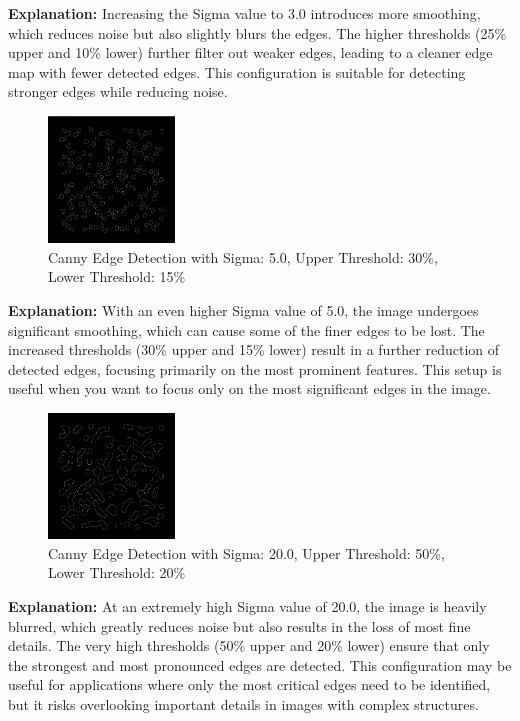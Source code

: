 \documentclass[%
	a4paper, %
	12pt, %
	english, %
	bibtotoc %
]{scrartcl}
\begin{document}
\textbf{Explanation:} Increasing the Sigma value to 3.0 introduces more smoothing, which reduces noise but also slightly blurs the edges. The higher thresholds (25\% upper and 10\% lower) further filter out weaker edges, leading to a cleaner edge map with fewer detected edges. This configuration is suitable for detecting stronger edges while reducing noise.

\begin{figure}[H]
    \centering
    \includegraphics[width=0.3\textwidth]{latex-template-ss24/images/5_30_15_canny.png}
    \caption{Canny Edge Detection with Sigma: 5.0, Upper Threshold: 30\%, Lower Threshold: 15\%}
    \label{fig:5_30_15_canny}
\end{figure}

\textbf{Explanation:} With an even higher Sigma value of 5.0, the image undergoes significant smoothing, which can cause some of the finer edges to be lost. The increased thresholds (30\% upper and 15\% lower) result in a further reduction of detected edges, focusing primarily on the most prominent features. This setup is useful when you want to focus only on the most significant edges in the image.

\begin{figure}[H]
    \centering
    \includegraphics[width=0.3\textwidth]{latex-template-ss24/images/20_50_20_canny.png}
    \caption{Canny Edge Detection with Sigma: 20.0, Upper Threshold: 50\%, Lower Threshold: 20\%}
    \label{fig:20_50_20_canny}
\end{figure}

\textbf{Explanation:} At an extremely high Sigma value of 20.0, the image is heavily blurred, which greatly reduces noise but also results in the loss of most fine details. The very high thresholds (50\% upper and 20\% lower) ensure that only the strongest and most pronounced edges are detected. This configuration may be useful for applications where only the most critical edges need to be identified, but it risks overlooking important details in images with complex structures.
\end{document}
